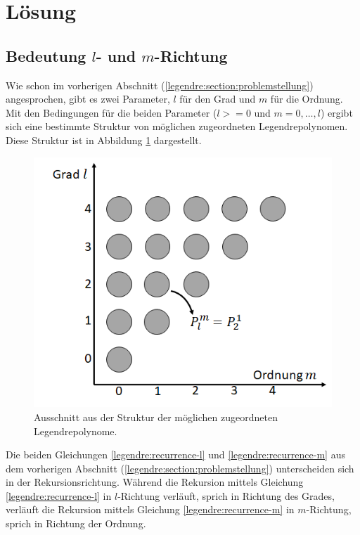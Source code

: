 %
%
%
\section{Lösung
\label{legendre:section:loesung}}
\subsection{Bedeutung $l$- und $m$-Richtung
\label{legendre:subsection:lmrichtung}}
Wie schon im vorherigen Abschnitt (\ref{legendre:section:problemstellung}) angesprochen, gibt es zwei Parameter, $l$ für den Grad und $m$ für die Ordnung.
Mit den Bedingungen für die beiden Parameter ($l>=0$ und $m=0, \ldots , l$) ergibt sich eine bestimmte Struktur von möglichen zugeordneten Legendrepolynomen.
Diese Struktur ist in Abbildung \ref{legendre:fig:struktur} dargestellt.
\begin{figure}[!h]
\centering
\includegraphics[width=0.6\linewidth]{papers/legendre/plots/legendre_struktur}
\caption{Ausschnitt aus der Struktur der möglichen zugeordneten Legendrepolynome.}
\label{legendre:fig:struktur}
\end{figure}
Die beiden Gleichungen \eqref{legendre:recurrence-l} und \eqref{legendre:recurrence-m} aus dem vorherigen Abschnitt (\ref{legendre:section:problemstellung}) unterscheiden sich in der Rekursionsrichtung.
Während die Rekursion mittels Gleichung \eqref{legendre:recurrence-l} in $l$-Richtung verläuft, sprich in Richtung des Grades, verläuft die Rekursion mittels Gleichung \eqref{legendre:recurrence-m} in $m$-Richtung, sprich in Richtung der Ordnung.

